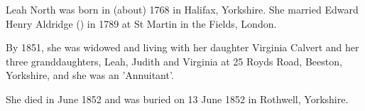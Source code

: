 
Leah North was born in (about) 1768 in Halifax, Yorkshire. She married Edward Henry Aldridge () in 1789 at St Martin in the Fields, London.

By 1851, she was widowed and living with her daughter Virginia Calvert and her three granddaughters, Leah, Judith and Virginia at 25 Royds Road, Beeston, Yorkshire,  and she was an 'Annuitant'.\cite{LNorth1851}

She died in June 1852 and was buried on 13 June 1852 in Rothwell, Yorkshire.\cite{LNorthDeath}
